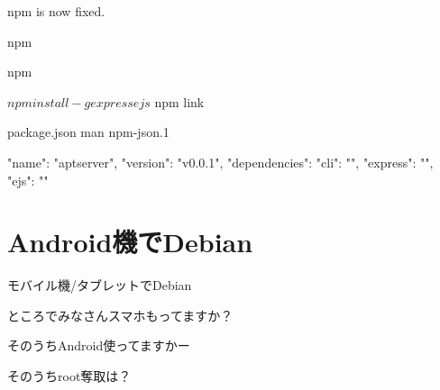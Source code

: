 \begin{frame}{npm}
 is now fixed.
\end{frame}

\begin{frame}[containsverbatim]{npm}
\end{frame}

\begin{frame}[containsverbatim]{npm}
 \begin{commandline}
$ npm install -g express ejs
$ npm link
 \end{commandline}
\end{frame}

\begin{frame}[containsverbatim]{package.json}
 man npm-json.1\\
\begin{commandline}
{
    "name": "aptserver",
    "version": "v0.0.1",
    "dependencies": {
	"cli": "",
	"express": "",
	"ejs": ""
    }
} 
\end{commandline}
\end{frame}

\section{Android機でDebian}


\begin{frame}{モバイル機/タブレットでDebian}


\end{frame}

\begin{frame}{ところでみなさんスマホもってますか？}


\end{frame}

\begin{frame}{そのうちAndroid使ってますかー}


\end{frame}

\begin{frame}{そのうちroot奪取は？}


\end{frame}

